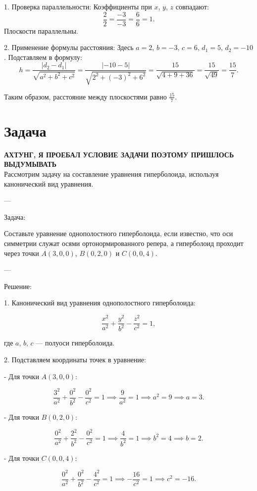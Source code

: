 \documentclass[a4paper,14pt]{extreport} %
\begin{document}
1.  Проверка параллельности: 
   Коэффициенты при \( x \), \( y \), \( z \) совпадают:
   \[
   \frac{2}{2} = \frac{-3}{-3} = \frac{6}{6} = 1.
   \]
   Плоскости параллельны.

2.  Применение формулы расстояния: 
   Здесь \( a = 2 \), \( b = -3 \), \( c = 6 \), \( d_1 = 5 \), \( d_2 = -10 \). Подставляем в формулу:
   \[
   h = \frac{|d_2 - d_1|}{\sqrt{a^2 + b^2 + c^2}} = \frac{|-10 - 5|}{\sqrt{2^2 + (-3)^2 + 6^2}} = \frac{15}{\sqrt{4 + 9 + 36}} = \frac{15}{\sqrt{49}} = \frac{15}{7}.
   \]

Таким образом, расстояние между плоскостями равно \( \frac{15}{7} \).
\section*{Задача}
\textbf{АХТУНГ, Я ПРОЕБАЛ УСЛОВИЕ ЗАДАЧИ ПОЭТОМУ ПРИШЛОСЬ ВЫДУМЫВАТЬ}\\ 
Рассмотрим задачу на составление уравнения гиперболоида, используя канонический вид уравнения.

---

 Задача: 

Составьте уравнение однополостного гиперболоида, если известно, что оси симметрии служат осями ортонормированного репера, а гиперболоид проходит через точки \( A(3, 0, 0) \), \( B(0, 2, 0) \) и \( C(0, 0, 4) \).

---

 Решение: 

1.  Канонический вид уравнения однополостного гиперболоида: 

   \[
   \frac{x^2}{a^2} + \frac{y^2}{b^2} - \frac{z^2}{c^2} = 1,
   \]

   где \( a \), \( b \), \( c \) — полуоси гиперболоида.

2.  Подставляем координаты точек в уравнение: 

   - Для точки \( A(3, 0, 0) \):

     \[
     \frac{3^2}{a^2} + \frac{0^2}{b^2} - \frac{0^2}{c^2} = 1 \implies \frac{9}{a^2} = 1 \implies a^2 = 9 \implies a = 3.
     \]

   - Для точки \( B(0, 2, 0) \):

     \[
     \frac{0^2}{a^2} + \frac{2^2}{b^2} - \frac{0^2}{c^2} = 1 \implies \frac{4}{b^2} = 1 \implies b^2 = 4 \implies b = 2.
     \]

   - Для точки \( C(0, 0, 4) \):

     \[
     \frac{0^2}{a^2} + \frac{0^2}{b^2} - \frac{4^2}{c^2} = 1 \implies -\frac{16}{c^2} = 1 \implies c^2 = -16.
     \]
\end{document}

